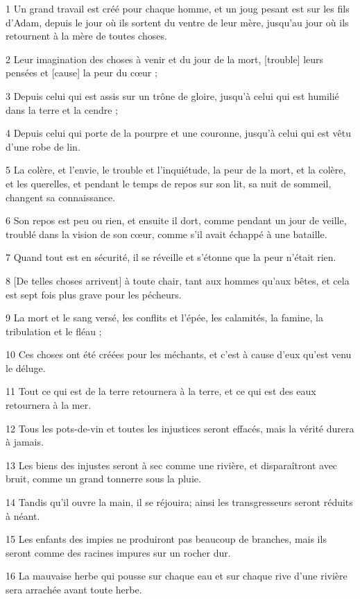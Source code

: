 
\par 1 Un grand travail est créé pour chaque homme, et un joug pesant est sur les fils d'Adam, depuis le jour où ils sortent du ventre de leur mère, jusqu'au jour où ils retournent à la mère de toutes choses.
\par 2 Leur imagination des choses à venir et du jour de la mort, [trouble] leurs pensées et [cause] la peur du cœur ;
\par 3 Depuis celui qui est assis sur un trône de gloire, jusqu'à celui qui est humilié dans la terre et la cendre ;
\par 4 Depuis celui qui porte de la pourpre et une couronne, jusqu'à celui qui est vêtu d'une robe de lin.
\par 5 La colère, et l'envie, le trouble et l'inquiétude, la peur de la mort, et la colère, et les querelles, et pendant le temps de repos sur son lit, sa nuit de sommeil, changent sa connaissance.
\par 6 Son repos est peu ou rien, et ensuite il dort, comme pendant un jour de veille, troublé dans la vision de son cœur, comme s'il avait échappé à une bataille.
\par 7 Quand tout est en sécurité, il se réveille et s'étonne que la peur n'était rien.
\par 8 [De telles choses arrivent] à toute chair, tant aux hommes qu'aux bêtes, et cela est sept fois plus grave pour les pécheurs.
\par 9 La mort et le sang versé, les conflits et l'épée, les calamités, la famine, la tribulation et le fléau ;
\par 10 Ces choses ont été créées pour les méchants, et c'est à cause d'eux qu'est venu le déluge.
\par 11 Tout ce qui est de la terre retournera à la terre, et ce qui est des eaux retournera à la mer.
\par 12 Tous les pots-de-vin et toutes les injustices seront effacés, mais la vérité durera à jamais.
\par 13 Les biens des injustes seront à sec comme une rivière, et disparaîtront avec bruit, comme un grand tonnerre sous la pluie.
\par 14 Tandis qu'il ouvre la main, il se réjouira; ainsi les transgresseurs seront réduits à néant.
\par 15 Les enfants des impies ne produiront pas beaucoup de branches, mais ils seront comme des racines impures sur un rocher dur.
\par 16 La mauvaise herbe qui pousse sur chaque eau et sur chaque rive d'une rivière sera arrachée avant toute herbe.
